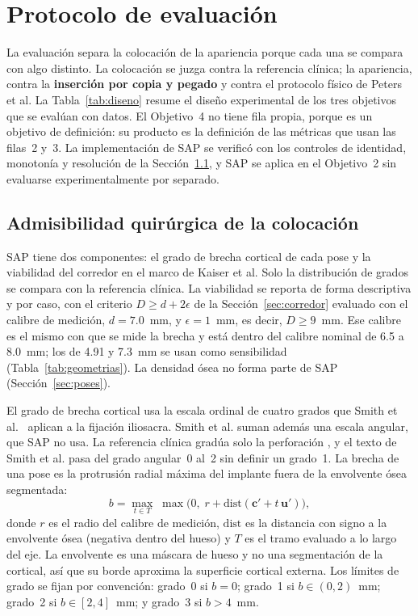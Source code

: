 \section{Protocolo de evaluación}\label{sec:evaluacion}

La evaluación separa la colocación de la apariencia porque cada una se compara con algo distinto. La colocación se juzga contra la referencia clínica; la apariencia, contra la \textbf{inserción por copia y pegado} y contra el protocolo físico de Peters et al. La Tabla~\ref{tab:diseno} resume el diseño experimental de los tres objetivos que se evalúan con datos. El Objetivo~4 no tiene fila propia, porque es un objetivo de definición: su producto es la definición de las métricas que usan las filas~2 y~3. La implementación de SAP se verificó con los controles de identidad, monotonía y resolución de la Sección~\ref{sec:sap}, y SAP se aplica en el Objetivo~2 sin evaluarse experimentalmente por separado.

\subsection{Admisibilidad quirúrgica de la colocación}\label{sec:sap}

SAP tiene dos componentes: el grado de brecha cortical de cada pose y la viabilidad del corredor en el marco de Kaiser et al. Solo la distribución de grados se compara con la referencia clínica. La viabilidad se reporta de forma descriptiva y por caso, con el criterio $D \geq d + 2\epsilon$ de la Sección~\ref{sec:corredor} evaluado con el calibre de medición, $d = 7.0$~mm, y $\epsilon = 1$~mm, es decir, $D \geq 9$~mm. Ese calibre es el mismo con que se mide la brecha y está dentro del calibre nominal de 6.5 a 8.0~mm; los de 4.91 y 7.3~mm se usan como sensibilidad (Tabla~\ref{tab:geometrias}). La densidad ósea no forma parte de SAP (Sección~\ref{sec:poses}).

El grado de brecha cortical usa la escala ordinal de cuatro grados que Smith et al.~\cite{smith2006iliosacral} aplican a la fijación iliosacra. Smith et al. suman además una escala angular, que SAP no usa. La referencia clínica gradúa solo la perforación \cite{zwingmann2009navigated}, y el texto de Smith et al. pasa del grado angular~0 al~2 sin definir un grado~1. La brecha de una pose es la protrusión radial máxima del implante fuera de la envolvente ósea segmentada:
\begin{equation}
b = \max_{t \in T} \; \max\bigl(0,\; r + \mathrm{dist}(\mathbf{c}' + t\,\mathbf{u}')\bigr),
\label{eq:brecha}
\end{equation}
donde $r$ es el radio del calibre de medición, $\mathrm{dist}$ es la distancia con signo a la envolvente ósea (negativa dentro del hueso) y $T$ es el tramo evaluado a lo largo del eje. La envolvente es una máscara de hueso y no una segmentación de la cortical, así que su borde aproxima la superficie cortical externa. Los límites de grado se fijan por convención: grado~0 si $b = 0$; grado~1 si $b \in (0, 2)$~mm; grado~2 si $b \in [2, 4]$~mm; y grado~3 si $b > 4$~mm.

